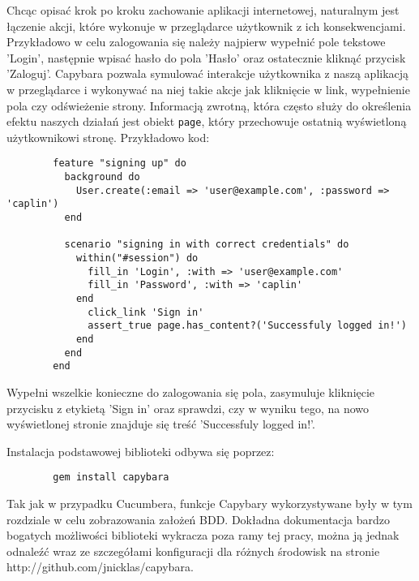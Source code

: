       Chcąc opisać krok po kroku zachowanie aplikacji internetowej, naturalnym jest łączenie akcji, które wykonuje w przeglądarce użytkownik z ich konsekwencjami. Przykładowo w celu zalogowania się należy najpierw wypełnić pole tekstowe 'Login', następnie wpisać hasło do pola 'Hasło' oraz ostatecznie kliknąć przycisk 'Zaloguj'. Capybara pozwala symulować interakcje użytkownika z naszą aplikacją w przeglądarce i wykonywać na niej takie akcje jak kliknięcie w link, wypełnienie pola czy odświeżenie strony.
      Informacją zwrotną, która często służy do określenia efektu naszych działań jest obiekt \verb+page+, który przechowuje ostatnią wyświetloną użytkownikowi stronę. Przykładowo kod:
      
      \begin{verbatim}
        feature "signing up" do
          background do
            User.create(:email => 'user@example.com', :password => 'caplin')
          end

          scenario "signing in with correct credentials" do
            within("#session") do
              fill_in 'Login', :with => 'user@example.com'
              fill_in 'Password', :with => 'caplin'
            end
              click_link 'Sign in'
              assert_true page.has_content?('Successfuly logged in!')
            end
          end
        end
      \end{verbatim}
      
      Wypełni wszelkie konieczne do zalogowania się pola, zasymuluje kliknięcie przycisku z etykietą 'Sign in' oraz sprawdzi, czy w wyniku tego, na nowo wyświetlonej stronie znajduje się treść 'Successfuly logged in!'.
      
      Instalacja podstawowej biblioteki odbywa się poprzez:
      
      \begin{verbatim}
        gem install capybara
      \end{verbatim}
      
      Tak jak w przypadku Cucumbera, funkcje Capybary wykorzystywane były w tym rozdziale w celu zobrazowania założeń BDD. Dokładna dokumentacja bardzo bogatych możliwości biblioteki wykracza poza ramy tej pracy, można ją jednak odnaleźć wraz ze szczegółami konfiguracji dla różnych środowisk na stronie http://github.com/jnicklas/capybara.
      